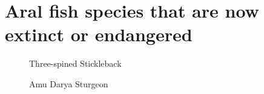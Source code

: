 

\chapter{Aral fish species that are now extinct or endangered}
\label{cp:aral-wildlife}

\begin{figure}[htbp]
  \centering
  \begin{minipage}[b]{0.45\textwidth}
    \centering
    \caption{Three-spined Stickleback}
    \label{fig:stickle}
  \end{minipage}
  \hfill
  \begin{minipage}[b]{0.45\textwidth}
  \centering
    \caption{Amu Darya Sturgeon }
    \label{fig:darya}
  \end{minipage}
\end{figure}

